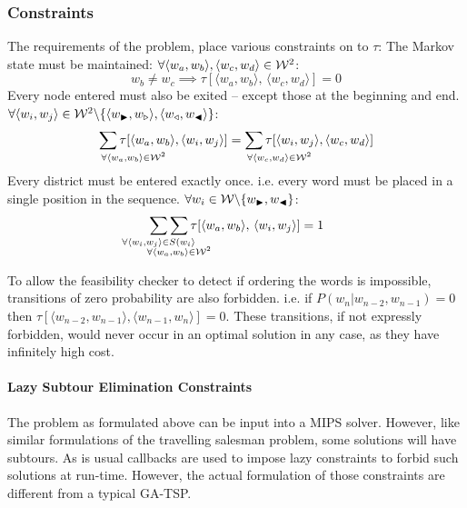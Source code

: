 \documentclass{standalone}
\begin{document}
\subsubsection{Constraints}
The requirements of the problem, place various constraints on to $\tau$:
%
The Markov state must be maintained: $\forall\langle w_{a},w_{b}\rangle,\langle w_{c},w_{d}\rangle\in\mathcal{W}^{2}$:
\begin{equation*}
w_{b}\ne w_{c} \implies \tau[\langle w_{a},w_{b}\rangle,\,\langle w_{c},w_{d}\rangle]=0
\end{equation*}
%
Every node entered must also be exited -- except those at the beginning and end. \\$\forall\langle w_{i},w_{j}\rangle\in\mathcal{W}^{2}\backslash\{\langle w_{\blacktriangleright},w_{\triangleright}\rangle,\langle w_{\triangleleft},w_{\blacktriangleleft}\rangle\}$: 
\begin{gather*}%
 \sum_{\mathrlap{\!\!\!\!\forall\langle w_{a},w_{b}\rangle\in\W^{2}}}\tau[\langle w_{a},w_{b}\rangle,\langle w_{i},w_{j}\rangle]
=\sum_{\mathrlap{\!\!\!\!\forall\langle w_{c},w_{d}\rangle\in\W^{2}}}\tau[\langle w_{i},w_{j}\rangle,\langle w_{c},w_{d}\rangle]
\end{gather*}
%
Every district must be entered exactly once. i.e. every word must be placed in a single position in the sequence. $\forall w_{i}\in\mathcal{W}\backslash\{w_{\blacktriangleright},w_{\blacktriangleleft}\}$:
\displayunskip
\begin{gather*}
\sum_{\mathclap{\forall\langle w_{i},w_{j}\rangle\in S(w_{i}\rangle}}
\sum_{\mathclap{\substack{\; \\ \;\\ \forall\langle w_{a},w_{b}\rangle\in\W^{2}}}}
\tau[\langle w_{a},w_{b}\rangle,\,\langle w_{i},w_{j}\rangle]=1
\end{gather*}

To allow the feasibility checker to detect if ordering the words is
impossible, transitions of zero probability are also forbidden. i.e. if \mbox{$P(w_{n}|w_{n-2},w_{n-1})=0$} then \mbox{$\tau[\langle w_{n-2},w_{n-1}\rangle,\langle w_{n-1},w_{n}\rangle]=0$}.
These transitions, if not expressly forbidden, would never occur in
an optimal solution in any case, as they have infinitely high cost.


\paragraph{Lazy Subtour Elimination Constraints}

The problem as formulated above can be input into a MIPS solver. However, like similar formulations of the travelling salesman problem, some solutions will have subtours.
As is usual callbacks are used to impose lazy constraints to forbid such solutions at run-time.  
However, the actual formulation of those constraints are different from a typical GA-TSP.
\end{document}
